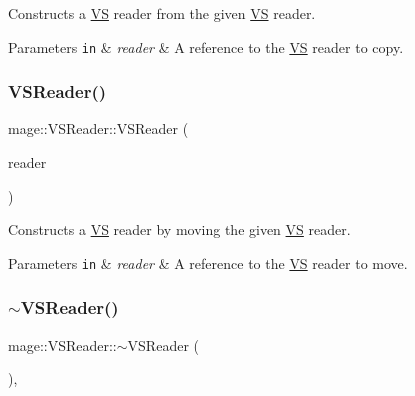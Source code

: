 Constructs a \hyperlink{structmage_1_1_v_s}{VS} reader from the given \hyperlink{structmage_1_1_v_s}{VS} reader.


\begin{DoxyParams}[1]{Parameters}
\mbox{\tt in}  & {\em reader} & A reference to the \hyperlink{structmage_1_1_v_s}{VS} reader to copy. \\
\hline
\end{DoxyParams}
\hypertarget{classmage_1_1_v_s_reader_aa7bb7d1792d4eef4734b4d4daa6e2ce7}{}\label{classmage_1_1_v_s_reader_aa7bb7d1792d4eef4734b4d4daa6e2ce7} 
\subsubsection{\texorpdfstring{V\+S\+Reader()}{VSReader()}\hspace{0.1cm}{\footnotesize\ttfamily [3/3]}}
{\footnotesize\ttfamily mage\+::\+V\+S\+Reader\+::\+V\+S\+Reader (\begin{DoxyParamCaption}\item[{\hyperlink{classmage_1_1_v_s_reader}{V\+S\+Reader} \&\&}]{reader }\end{DoxyParamCaption})\hspace{0.3cm}{\ttfamily [default]}}

Constructs a \hyperlink{structmage_1_1_v_s}{VS} reader by moving the given \hyperlink{structmage_1_1_v_s}{VS} reader.


\begin{DoxyParams}[1]{Parameters}
\mbox{\tt in}  & {\em reader} & A reference to the \hyperlink{structmage_1_1_v_s}{VS} reader to move. \\
\hline
\end{DoxyParams}
\hypertarget{classmage_1_1_v_s_reader_ae3cb230b06f289adae239b785f1fabc6}{}\label{classmage_1_1_v_s_reader_ae3cb230b06f289adae239b785f1fabc6} 
\subsubsection{\texorpdfstring{$\sim$\+V\+S\+Reader()}{~VSReader()}}
{\footnotesize\ttfamily mage\+::\+V\+S\+Reader\+::$\sim$\+V\+S\+Reader (\begin{DoxyParamCaption}{ }\end{DoxyParamCaption})\hspace{0.3cm}{\ttfamily [virtual]}, {\ttfamily [default]}}


